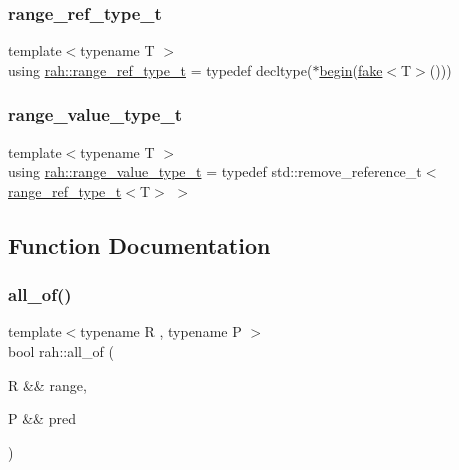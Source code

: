 \mbox{\label{namespacerah_a6622426bea22e9509614fe4c574ebeca}} 
\subsubsection{\texorpdfstring{range\_ref\_type\_t}{range\_ref\_type\_t}}
{\footnotesize\ttfamily template$<$typename T $>$ \\
using \mbox{\hyperlink{namespacerah_a6622426bea22e9509614fe4c574ebeca}{rah\+::range\+\_\+ref\+\_\+type\+\_\+t}} = typedef decltype($\ast$\mbox{\hyperlink{namespacerah_a2c4a19e57cc4e0753e93830f247def6d}{begin}}(\mbox{\hyperlink{namespacerah_aa659f5ae02cb923cd8813f96cfd86a25}{fake}}$<$T$>$()))}

\mbox{\label{namespacerah_a4b32e39fb106af7036b20a39c4f024c1}} 
\subsubsection{\texorpdfstring{range\_value\_type\_t}{range\_value\_type\_t}}
{\footnotesize\ttfamily template$<$typename T $>$ \\
using \mbox{\hyperlink{namespacerah_a4b32e39fb106af7036b20a39c4f024c1}{rah\+::range\+\_\+value\+\_\+type\+\_\+t}} = typedef std\+::remove\+\_\+reference\+\_\+t$<$\mbox{\hyperlink{namespacerah_a6622426bea22e9509614fe4c574ebeca}{range\+\_\+ref\+\_\+type\+\_\+t}}$<$T$>$ $>$}



\subsection{Function Documentation}
\mbox{\label{namespacerah_aaf7abb6066c8adfe6959691c3a3ea4e2}} 
\subsubsection{\texorpdfstring{all\_of()}{all\_of()}\hspace{0.1cm}{\footnotesize\ttfamily [1/2]}}
{\footnotesize\ttfamily template$<$typename R , typename P $>$ \\
bool rah\+::all\+\_\+of (\begin{DoxyParamCaption}\item[{R \&\&}]{range,  }\item[{P \&\&}]{pred }\end{DoxyParamCaption})}



